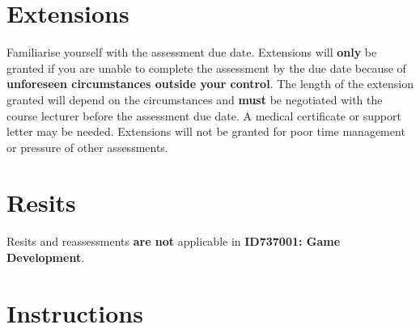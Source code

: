 \documentclass{article}
\begin{document}
\section*{Extensions}
Familiarise yourself with the assessment due date. Extensions will \textbf{only} be granted if you are unable to complete the assessment by the due date because of \textbf{unforeseen circumstances outside your control}. The length of the extension granted will depend on the circumstances and \textbf{must} be negotiated with the course lecturer before the assessment due date. A medical certificate or support letter may be needed. Extensions will not be granted for poor time management or pressure of other assessments.

\section*{Resits}
Resits and reassessments \textbf{are not} applicable in \textbf{ID737001: Game Development}.

\section*{Instructions}
\end{document}
